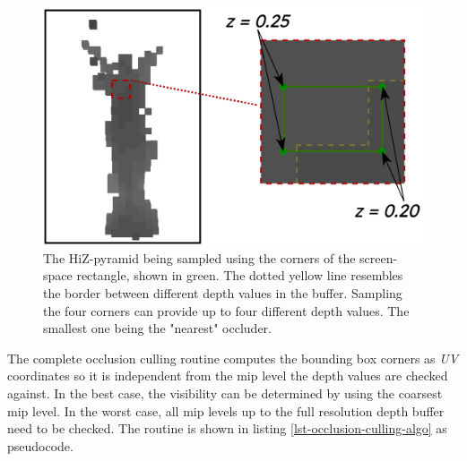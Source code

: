 \begin{figure}[h]
    \centering
    \includegraphics[width=\linewidth]{images/graphics/visibility-hiz-sampling.jpg}
    \caption{The \ac{HiZ}-pyramid being sampled using the corners of the screen-space rectangle, shown in green. 
    The dotted yellow line resembles the border between different depth values in the buffer. Sampling the four 
    corners can provide up to four different depth values. The smallest one being the "nearest" occluder.}
    \label{fig:visibility-hiz-sampling}
\end{figure}


\noindent
The complete occlusion culling routine computes the bounding box corners as \emph{UV} coordinates so it is independent 
from the mip level the depth values are checked against. In the best case, the visibility can be determined by using 
the coarsest mip level. In the worst case, all mip levels up to the full resolution depth buffer need to be checked.
The routine is shown in listing \ref{lst-occlusion-culling-algo} as pseudocode.

